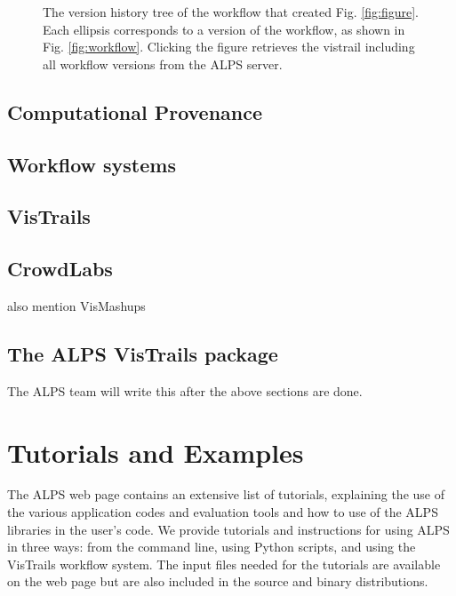 \documentclass[12pt]{iopart}
\begin{document}
\begin{figure}
\begin{center}
\caption{The version history tree of the workflow that created Fig. \ref{fig:figure}. Each ellipsis corresponds to a version of the workflow, as shown in Fig. \ref{fig:workflow}. Clicking the figure retrieves the vistrail including all workflow versions from the ALPS server.}
\label{fig:history}
\end{center}
\end{figure}

\subsection{Computational Provenance}
\subsection{Workflow systems}
\subsection{VisTrails}
\subsection{CrowdLabs}
also mention VisMashups
\subsection{The ALPS VisTrails package}
The ALPS team will write this after the above sections are done.
\section{Tutorials and Examples}

The ALPS web page \cite{alps} contains an extensive list of tutorials, explaining the use of the various application codes and evaluation tools and how to use of the ALPS libraries in the user's code. We provide tutorials and instructions for using ALPS in three ways: from the command line, using Python scripts, and using the VisTrails workflow system. The input files needed for the tutorials are available on the web page but are also included in the source and binary distributions.
\end{document}
